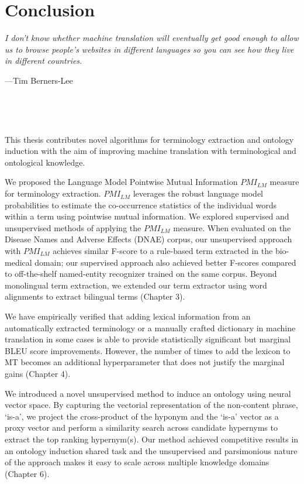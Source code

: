 \chapter{Conclusion}
\label{ch:conclusions}
\vspace{-5mm}
\epigraph{\itshape I don't know whether machine translation will eventually get good enough to allow us to browse people's websites in different languages so you can see how they live in different countries.}{---Tim Berners-Lee}
\vspace{-5mm}
\epigraph{\itshape \textcolor{white}{Translation is the art of failure.}}{\textcolor{white}{---Umberto Eco}}
\vspace{-5mm}

This thesis contributes novel algorithms for terminology extraction and ontology induction with the aim of improving machine translation with terminological and ontological knowledge. 

We proposed the Language Model Pointwise Mutual Information ${PMI_{LM}}$ measure for terminology extraction. ${PMI_{LM}}$ leverages the robust language model probabilities to estimate the co-occurrence statistics of the individual words within a term using pointwise mutual information. We explored supervised and unsupervised methods of applying the ${PMI_{LM}}$ measure. When evaluated on the Disease Names and Adverse Effects (DNAE) corpus, our unsupervised approach with ${PMI_{LM}}$ achieves similar F-score to a rule-based term extracted in the bio-medical domain; our supervised approach also achieved better F-scores compared to off-the-shelf named-entity recognizer trained on the same corpus. Beyond monolingual term extraction, we extended our term extractor using word alignments to extract bilingual terms (Chapter 3). 

We have empirically verified that adding lexical information from an automatically extracted terminology or a manually crafted dictionary in machine translation in some cases is able to provide statistically significant but marginal BLEU score improvements. However, the number of times to add the lexicon to MT becomes an additional hyperparameter that does not justify the marginal gains (Chapter 4). 

We introduced a novel unsupervised method to induce an ontology using neural vector space. By capturing the vectorial representation of the non-content phrase, `is-a', we project the cross-product of the hyponym and the `is-a' vector as a proxy vector and perform a similarity search across candidate hypernyms to extract the top ranking hypernym(s). Our method achieved competitive results in an ontology induction shared task and the unsupervised and parsimonious nature of the approach makes it easy to scale across multiple knowledge domains (Chapter 6).   

